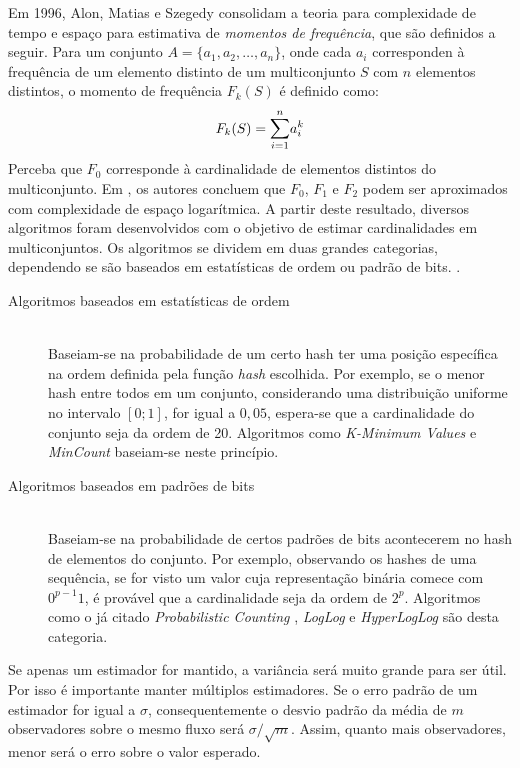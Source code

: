 Em 1996, Alon, Matias e Szegedy \cite{alon1996space} consolidam a teoria para complexidade de tempo e espaço para estimativa de \emph{momentos de frequência}, que são definidos a seguir. Para um conjunto $A = \{a_1, a_2, \dots, a_n\}$, onde cada $a_i$ corresponden à frequência de um elemento distinto de um multiconjunto $S$ com $n$ elementos distintos, o momento de frequência $F_k(S)$ é definido como:
\[
F_k(S) = \mathlarger{\sum}_{i=1}^n a_i^k
\]
Perceba que $F_0$ corresponde à cardinalidade de elementos distintos do multiconjunto. Em \cite{alon1996space}, os autores concluem que $F_0$, $F_1$ e $F_2$ podem ser aproximados com complexidade de espaço logarítmica. A partir deste resultado, diversos algoritmos foram desenvolvidos com o objetivo de estimar cardinalidades em multiconjuntos. Os algoritmos se dividem em duas grandes categorias, dependendo se são baseados em estatísticas de ordem ou padrão de bits. \cite{flajolet2008hyperloglog,clifford2012statistical}.

\begin{description}
  \item[Algoritmos baseados em estatísticas de ordem] \hfill \\
    Baseiam-se na probabilidade de um certo hash ter uma posição específica na ordem definida pela função \emph{hash} escolhida. Por exemplo, se o menor hash entre todos em um conjunto, considerando uma distribuição uniforme no intervalo $[0; 1]$, for igual a $0,05$, espera-se que a cardinalidade do conjunto seja da ordem de 20. Algoritmos como \emph{K-Minimum Values} \cite{bar2002counting} e \emph{MinCount} \cite{giroire2009order} baseiam-se neste princípio.
  
  \item[Algoritmos baseados em padrões de bits] \hfill \\
    Baseiam-se na probabilidade de certos padrões de bits acontecerem no hash de elementos do conjunto. Por exemplo, observando os hashes de uma sequência, se for visto um valor cuja representação binária comece com $0^{p-1}1$, é provável que a cardinalidade seja da ordem de $2^p$. Algoritmos como o já citado \emph{Probabilistic Counting}  \cite{flajolet1985probabilistic}, \emph{LogLog} \cite{durand2003loglog} e \emph{HyperLogLog} \cite{flajolet2008hyperloglog} são desta categoria.
\end{description}

Se apenas um estimador for mantido, a variância será muito grande para ser útil. Por isso é importante manter múltiplos estimadores. Se o erro padrão de um estimador for igual a $\sigma$, consequentemente o desvio padrão da média de $m$ observadores sobre o mesmo fluxo será $\sigma/\sqrt{m}$. Assim, quanto mais observadores, menor será o erro sobre o valor esperado.

